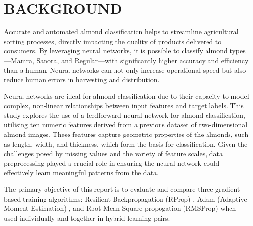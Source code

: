 
\section{BACKGROUND}

Accurate and automated almond classification helps to streamline agricultural sorting processes, 
directly impacting the quality of products delivered to consumers. By leveraging neural 
networks, it is possible to classify almond types—Mamra, Sanora, and Regular—with significantly higher 
accuracy and efficiency than a human. Neural networks can not only increase operational 
speed but also reduce human errors in harvesting and distribution.

Neural networks are ideal for almond-classification due to their capacity to model complex, non-linear 
relationships between input features and target labels. This study explores the use of a feedforward neural 
network for almond classification, utilising ten numeric features derived from a previous dataset of 
two-dimensional almond images. These features 
capture geometric properties of the almonds, such as length, width, and thickness, which form the basis for 
classification. Given the challenges posed by missing values and the variety of feature scales, data 
preprocessing played a crucial role in ensuring the neural network could effectively learn meaningful 
patterns from the data.

The primary objective of this report is to evaluate and compare three gradient-based training algorithms: 
Resilient Backpropagation (RProp) \cite{298623}, Adam (Adaptive Moment Estimation) \cite{kingma2017adammethodstochasticoptimization}, 
and Root Mean Square propogation (RMSProp) \cite{hinton2012rmsprop}
when used individually and together in hybrid-learning pairs. 

